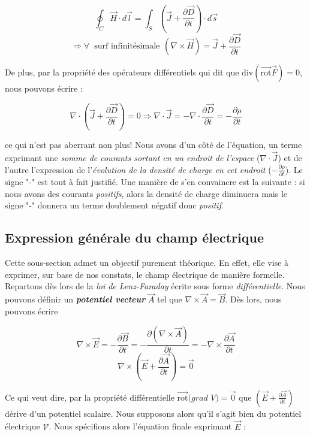 \[ \oint_{C} \vec{H} \cdot d\vec{l} = \int_{S} (\vec{J} +\frac{\partial \vec{D}}{\partial t}) \cdot d\vec{s} \]
\[ \Rightarrow \forall  \hspace{3pt} \mbox{ surf infinitésimale} \hspace{5pt} (\nabla \times \vec{H} ) = \vec{J} + \frac{\partial \vec{D}}{\partial t}\]

De plus, par la propriété des opérateurs différentiels qui dit que $\text{div}(\vec{\text{rot}}\vec{F}) = 0$, nous pouvons écrire : 

\[ \nabla \cdot (\vec{J} + \frac{\partial \vec{D}}{\partial t}) = 0 \Rightarrow \nabla \cdot \vec{J} = - \nabla \cdot \frac{\partial \vec{D}}{\partial t} = - \frac{\partial \rho}{\partial t}\]

ce qui n'est pas aberrant non plus! Nous avons d'un côté de l'équation, un terme exprimant une \textit{somme de courants sortant en un endroit de l'espace} ($\nabla \cdot \vec{J}$) et de l'autre l'expression de l'\textit{évolution de la densité de charge en cet endroit} ($- \frac{\partial \rho}{\partial t}$). Le signe "-" est tout à fait justifié. Une manière de s'en convaincre est la suivante : si nous avons des courants \textit{positifs}, alors la densité de charge diminuera mais le signe "-" donnera un terme doublement négatif donc \textit{positif}.

\subsection{Expression générale du champ électrique}

Cette sous-section admet un objectif purement théorique. En effet, elle vise à exprimer, sur base de nos constats, le champ électrique de manière formelle. 
Repartons dès lors de la \textit{loi de Lenz-Faraday} écrite sous forme \textit{différentielle}.
Nous pouvons définir un \textit{\textbf{potentiel vecteur}} $\vec{A}$ tel que $\nabla \times \vec{A} = \vec{B}$.  Dès lors, nous pouvons écrire 

\[\nabla \times \vec{E} = - \frac{\partial \vec{B}}{\partial t} = -\frac{\partial (\nabla \times \vec{A})}{\partial t} = - \nabla \times \frac{\partial \vec{A}}{\partial t} \]
\[\nabla \times (\vec{E} + \frac{\partial \vec{A}}{\partial t}) = \vec{0} \]

Ce qui veut dire, par la propriété différentielle $\vec{\text{rot}}(grad$ $V) = \vec{0}$ que $(\vec{E} + \frac{\partial \vec{A}}{\partial t})$ dérive d'un potentiel scalaire.
Nous supposons alors qu'il s'agit bien du potentiel électrique $\mathcal{V}$. Nous spécifions alors l'équation finale exprimant $\vec{E}$ : 

